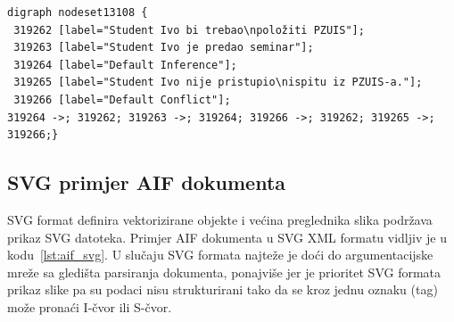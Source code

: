 \begin{lstlisting}[caption={Primjer AIF DOT dokumenta},label={lst:aif_dot},captionpos=b]
digraph nodeset13108 {
 319262 [label="Student Ivo bi trebao\npoložiti PZUIS"];
 319263 [label="Student Ivo je predao seminar"];
 319264 [label="Default Inference"];
 319265 [label="Student Ivo nije pristupio\nispitu iz PZUIS-a."];
 319266 [label="Default Conflict"];
319264 ->; 319262; 319263 ->; 319264; 319266 ->; 319262; 319265 ->; 319266;}
\end{lstlisting}

\subsection{SVG primjer AIF dokumenta}

SVG format definira vektorizirane objekte i većina preglednika slika podržava 
prikaz SVG datoteka. 
Primjer AIF dokumenta u SVG XML formatu vidljiv je u kodu~\ref{lst:aif_svg}.
U slučaju SVG formata najteže je doći do argumentacijske mreže sa gledišta parsiranja dokumenta, 
ponajviše jer je prioritet SVG formata prikaz slike pa su podaci nisu strukturirani tako da se
kroz jednu oznaku (tag) može pronaći I-čvor ili S-čvor. 

